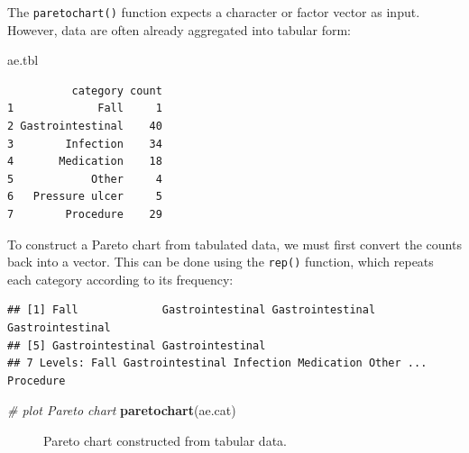 \documentclass[
]{book}
\makeatletter
\newenvironment{Shaded}{\begin{snugshade}}{\end{snugshade}}
\newcommand{\CommentTok}[1]{\textcolor[rgb]{0.56,0.35,0.01}{\textit{#1}}}
\newcommand{\FunctionTok}[1]{\textcolor[rgb]{0.13,0.29,0.53}{\textbf{#1}}}
\newcommand{\NormalTok}[1]{#1}
\newcommand{\OtherTok}[1]{\textcolor[rgb]{0.56,0.35,0.01}{#1}}
\newcommand{\SpecialCharTok}[1]{\textcolor[rgb]{0.81,0.36,0.00}{\textbf{#1}}}
\newcommand*\pandocbounded[1]{%
  \sbox\pandoc@box{#1}%
  \Gscale@div\@tempa{\textheight}{\dimexpr\ht\pandoc@box+\dp\pandoc@box\relax}%
  \Gscale@div\@tempb{\linewidth}{\wd\pandoc@box}%
  \ifdim\@tempb\p@<\@tempa\p@\let\@tempa\@tempb\fi%
  \ifdim\@tempa\p@<\p@\scalebox{\@tempa}{\usebox\pandoc@box}%
  \else\usebox{\pandoc@box}%
  \fi%
}
\makeatother
\begin{document}
The \texttt{paretochart()} function expects a character or factor vector
as input. However, data are often already aggregated into tabular form:

\begin{Shaded}
\begin{Highlighting}[]
\NormalTok{ae.tbl}
\end{Highlighting}
\end{Shaded}

\begin{verbatim}
          category count
1             Fall     1
2 Gastrointestinal    40
3        Infection    34
4       Medication    18
5            Other     4
6   Pressure ulcer     5
7        Procedure    29
\end{verbatim}

To construct a Pareto chart from tabulated data, we must first convert
the counts back into a vector. This can be done using the \texttt{rep()}
function, which repeats each category according to its frequency:

\begin{Shaded}
\end{Shaded}

\begin{verbatim}
## [1] Fall             Gastrointestinal Gastrointestinal Gastrointestinal
## [5] Gastrointestinal Gastrointestinal
## 7 Levels: Fall Gastrointestinal Infection Medication Other ... Procedure
\end{verbatim}

\begin{Shaded}
\begin{Highlighting}[]
\CommentTok{\# plot Pareto chart}
\FunctionTok{paretochart}\NormalTok{(ae.cat)}
\end{Highlighting}
\end{Shaded}

\begin{figure}
\centering
\pandocbounded{}
\caption{Pareto chart constructed from tabular data.}
\end{figure}
\end{document}
